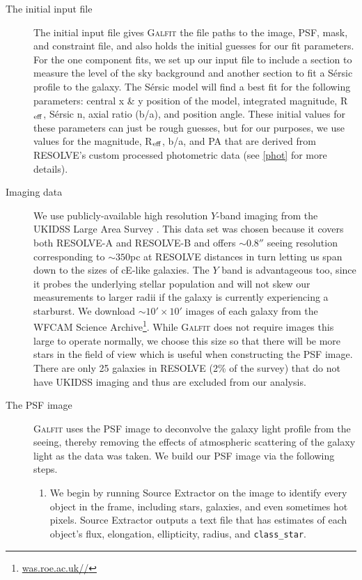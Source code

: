 \documentclass[iop,apj]{emulateapj}
\newcommand{\Reff}{R$_{\rm eff}$}
\begin{document}
\begin{description}

\item[The initial input file]{The initial input file gives \textsc{Galfit} the file paths to the image, PSF, mask, and constraint file, and also holds the initial guesses for our fit parameters. For the one component fits, we set up our input file to include a section to measure the level of the sky background and another section to fit a S\'ersic profile to the galaxy. The S\'ersic model will find a best fit for the following parameters: central x \& y position of the model, integrated magnitude, \Reff, S\'ersic n, axial ratio (b/a), and position angle. These initial values for these parameters can just be rough guesses, but for our purposes, we use values for the magnitude, \Reff, b/a, and PA that are derived from RESOLVE's custom processed photometric data (see \autoref{phot} for more details).}

\item[Imaging data]{We use publicly-available high resolution $Y$-band imaging from the UKIDSS Large Area Survey \citep{Lawrence2007}. This data set was chosen because it covers both RESOLVE-A and RESOLVE-B and offers $\sim0.8''$ seeing resolution corresponding to $\sim350$pc at RESOLVE distances in turn letting us span down to the sizes of cE-like galaxies. The $Y$ band is advantageous too, since it probes the underlying stellar population and will not skew our measurements to larger radii if the galaxy is currently experiencing a starburst. We download $\sim10'\times10'$ images of each galaxy from the WFCAM Science Archive\footnote{\url{was.roe.ac.uk//}}}. While \textsc{Galfit} does not require images this large to operate normally, we choose this size so that there will be more stars in the field of view which is useful when constructing the PSF image. There are only 25 galaxies in RESOLVE (2\% of the survey) that do not have UKIDSS imaging and thus are excluded from our analysis.

\item[The PSF image]{\textsc{Galfit} uses the PSF image to deconvolve the galaxy light profile from the seeing, thereby removing the effects of atmospheric scattering of the galaxy light as the data was taken. We build our PSF image via the following steps.
\begin{enumerate}

\item We begin by running Source Extractor on the image to identify every object in the frame, including stars, galaxies, and even sometimes hot pixels. Source Extractor outputs a text file that has estimates of each object's flux, elongation, ellipticity, radius, and \texttt{class\_star}.


\end{enumerate}}
\end{description}
\end{document}
